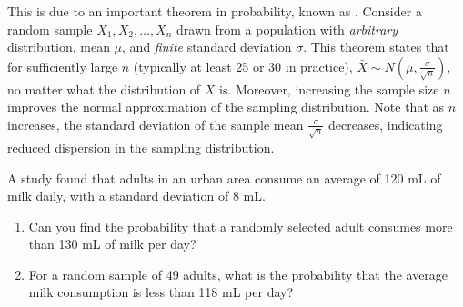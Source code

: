 This is due to an important theorem in probability, known as .
Consider a random sample \( X_1, X_2, \ldots, X_n \) drawn from a population with \textit{arbitrary} distribution, mean \( \mu \), and \textit{finite} standard deviation \( \sigma \).
This theorem states that for sufficiently large \( n \) (typically at least 25 or 30 in practice), \( \bar{X} \sim N(\mu, \frac{\sigma}{\sqrt{n}}) \), no matter what the distribution of \( X \) is.
Moreover, increasing the sample size \( n \) improves the normal approximation of the sampling distribution.
Note that as \( n \) increases, the standard deviation of the sample mean \( \frac{\sigma}{\sqrt{n}} \) decreases, indicating reduced dispersion in the sampling distribution.

\begin{exmp}
    A study found that adults in an urban area consume an average of 120 mL of milk daily, with a standard deviation of 8 mL.
    \begin{enumerate}
        \item Can you find the probability that a randomly selected adult consumes more than 130 mL of milk per day?
        \item For a random sample of 49 adults, what is the probability that the average milk consumption is less than 118 mL per day?
    \end{enumerate}
\end{exmp}
